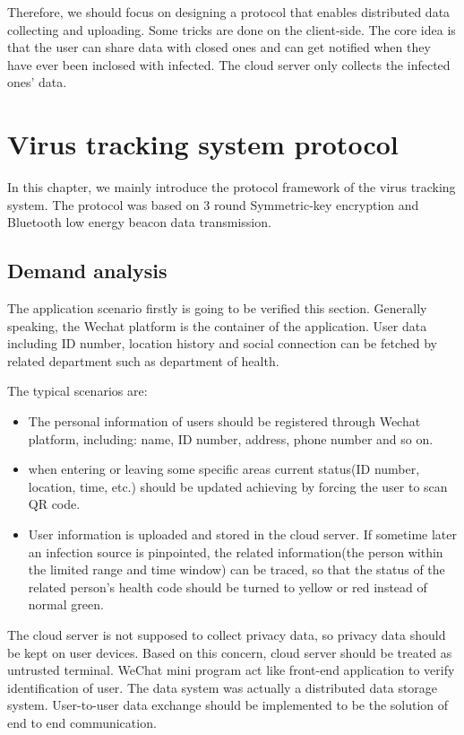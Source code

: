 \documentclass[11pt,en]{elegantpaper}
\begin{document}
Therefore, we should focus on designing a protocol that enables distributed data collecting and uploading. Some tricks are done on the client-side. The core idea is that the user can share data with closed ones and can get notified when they have ever been inclosed with infected. The cloud server only collects the infected ones' data.

\section{Virus tracking system protocol}
In this chapter, we mainly introduce the protocol framework of the virus tracking system. The protocol was based on 3 round Symmetric-key encryption and Bluetooth low energy beacon data transmission. 

\subsection{Demand analysis}
The application scenario firstly is going to be verified this section. Generally speaking, the Wechat platform is the container of the application. User data including ID number, location history and social connection can be fetched by related department such as department of health.

The typical scenarios are:
\begin{itemize}
	\item The personal information of users should be registered through Wechat platform, including: name, ID number, address, phone number and so on.
	\item when entering or leaving some specific areas current status(ID number, location, time, etc.) should be updated achieving by forcing the user to scan QR code.
	\item User information is uploaded and stored in the cloud server. If sometime later an infection source is pinpointed, the related information(the person within the limited range and time window) can be traced, so that the status of the related person’s health code should be turned to yellow or red instead of normal green.
\end{itemize}

The cloud server is not supposed to collect privacy data, so privacy data should be kept on user devices. Based on this concern, cloud server should be treated as untrusted terminal\cite{berke2020assessing}. WeChat mini program act like front-end application to verify identification of user. The data system was actually a distributed data storage system. User-to-user data exchange should be implemented to be the solution of end to end communication.
\end{document}
